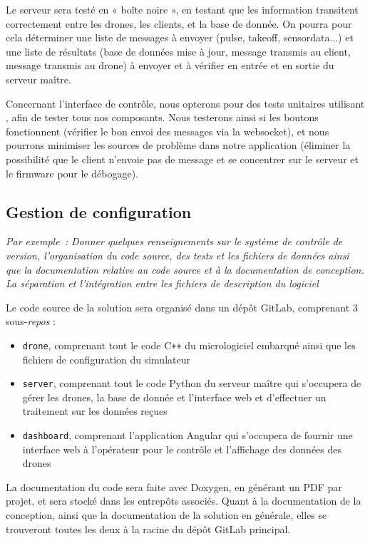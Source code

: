 \documentclass{mistcoursedoc}
\begin{document}
Le serveur sera testé en « boîte noire », en testant que les information transitent correctement entre les drones, les clients, et la base de donnée. On pourra pour cela déterminer une liste de messages à envoyer (pulse, takeoff, sensordata...) et une liste de résultats (base de données mise à jour, message transmis au client, message transmis au drone) à envoyer et à vérifier en entrée et en sortie du serveur maître.

Concernant l'interface de contrôle, nous opterons pour des tests unitaires utilisant , afin de tester tous nos composants. Nous testerons ainsi si les boutons fonctionnent (vérifier le bon envoi des messages via la websocket), et nous pourrons minimiser les sources de problème dans notre application (éliminer la possibilité que le client n'envoie pas de message et se concentrer sur le serveur et le firmware pour le débogage).

\subsection{Gestion de configuration}

\textit{Par exemple : Donner quelques renseignements sur le système de contrôle de version, l’organisation du code source, des tests et les fichiers de données ainsi que la documentation relative au code source et à la documentation de conception.  La séparation et l’intégration entre les fichiers de description du logiciel}

Le code source de la solution sera organisé dans un dépôt GitLab, comprenant 3 sous-\textit{repos} :
\begin{itemize}
  \item \texttt{drone}, comprenant tout le code C\texttt{++} du micrologiciel embarqué ainsi que les fichiers de configuration du simulateur
  \item \texttt{server}, comprenant tout le code Python du serveur maître qui s’occupera de gérer les drones, la base de donnée et l'interface web et d’effectuer un traitement sur les données reçues
  \item \texttt{dashboard}, comprenant l'application Angular qui s’occupera de fournir une interface web à l’opérateur pour le contrôle et l’affichage des données des drones
\end{itemize}

La documentation du code sera faite avec Doxygen, en générant un PDF par projet, et sera stocké dans les entrepôts associés. Quant à la documentation de la conception, ainsi que la documentation de la solution en générale, elles se trouveront toutes les deux à la racine du dépôt GitLab principal.
\end{document}
